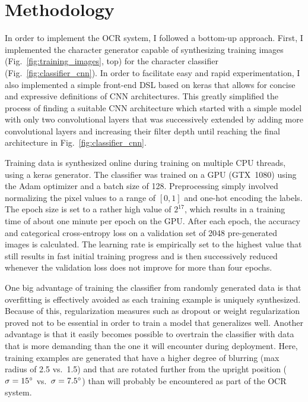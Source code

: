 \documentclass[12pt]{article}
\newcommand\figref[1]{Fig.~\ref{fig:#1}}
\begin{document}
\section{Methodology}
In order to implement the OCR system, I followed a bottom-up approach. First, I implemented
the character generator capable of synthesizing training images (\figref{training_images}, top)
for the character classifier (\figref{classifier_cnn}). In order to facilitate easy and rapid
experimentation, I also implemented a simple front-end DSL based on keras \cite{KerasDoc40:online} that allows
for concise and expressive definitions of CNN architectures. This greatly simplified the
process of finding a suitable CNN architecture which started with a simple model with only
two convolutional layers that was successively extended by adding more convolutional layers
and increasing their filter depth until reaching the final architecture in \figref{classifier_cnn}.

Training data is synthesized online during training on multiple CPU threads, using a keras generator. The classifier was trained
on a GPU (GTX~1080) using the Adam optimizer \cite{Kingma2014} and a batch size of 128.
Preprocessing simply involved normalizing the pixel values to a range of $[0, 1]$ and one-hot encoding
the labels. The epoch size is set to a rather high value of $2^{17}$,
which results in a training time of about one minute per epoch on the GPU.
After each epoch, the accuracy and categorical cross-entropy loss on a validation set of
2048 pre-generated images is calculated.
The learning rate is empirically set to the highest value that still results in fast initial training progress and is then
successively reduced whenever the validation loss does not improve for more than four epochs.

One big advantage of training the classifier from randomly generated data is that overfitting
is effectively avoided as each training example is uniquely synthesized. Because of this,
regularization measures such as dropout \cite{Srivastava2014} or weight regularization proved not to be essential
in order to train a model that generalizes well. Another advantage is that it easily becomes
possible to overtrain the classifier with data that is more demanding than the one it will
encounter during deployment. Here, training examples are generated that have a higher degree
of blurring (max radius of 2.5 vs.\ 1.5) and that are rotated further from the upright position
($\sigma=15\degree$ vs.\ $\sigma=7.5\degree$)
than will probably be encountered as part of the OCR system.
\end{document}
